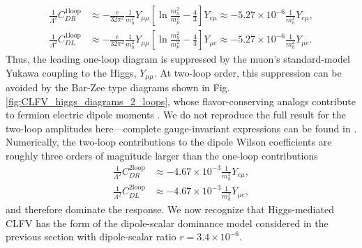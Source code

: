 \documentclass[12pt,letterpaper]{book}
\begin{document}
\begin{equation}
\begin{split}
\frac{1}{\Lambda^2}C_{DR}^{1\mathrm{loop}}&\approx-\frac{e}{32\pi^2}\frac{1}{m_h^2}Y_{\mu\mu}\left[\ln\frac{m_h^2}{m_{\mu}^2}-\frac{4}{3}\right]Y_{e\mu}\approx -5.27\times 10^{-6}\frac{1}{m_h^2}Y_{e\mu},\\
\frac{1}{\Lambda^2}C_{DL}^{1\mathrm{loop}}&\approx-\frac{e}{32\pi^2}\frac{1}{m_h^2}Y_{\mu\mu}\left[\ln\frac{m_h^2}{m_{\mu}^2}-\frac{4}{3}\right]Y_{\mu e}\approx -5.27\times 10^{-6}\frac{1}{m_h^2}Y_{\mu e}.
\end{split}
\end{equation}
Thus, the leading one-loop diagram is suppressed by the muon's standard-model Yukawa coupling to the Higgs, $Y_{\mu\mu}$. At two-loop order, this suppression can be avoided by the Bar-Zee type diagrams shown in Fig. \ref{fig:CLFV_higgs_diagrams_2_loops}, whose flavor-conserving analogs contribute to fermion electric dipole moments \cite{PhysRevLett.65.21,Abe:2013qla}. We do not reproduce the full result for the two-loop amplitudes here---complete gauge-invariant expressions can be found in \cite{Cirigliano:2021img}. Numerically, the two-loop contributions to the dipole Wilson coefficients are roughly three orders of magnitude larger than the one-loop contributions
\begin{equation}
\begin{split}
\frac{1}{\Lambda^2}C_{DR}^{2\mathrm{loop}}&\approx -4.67\times 10^{-3}\frac{1}{m_h^2}Y_{e\mu},\\
\frac{1}{\Lambda^2}C_{DL}^{2\mathrm{loop}}&\approx -4.67\times 10^{-3}\frac{1}{m_h^2}Y_{\mu e},
\end{split}
\end{equation}
and therefore dominate the response. We now recognize that Higgs-mediated CLFV has the form of the dipole-scalar dominance model considered in the previous section with dipole-scalar ratio $r=3.4\times 10^{-6}$. 
\end{document}
